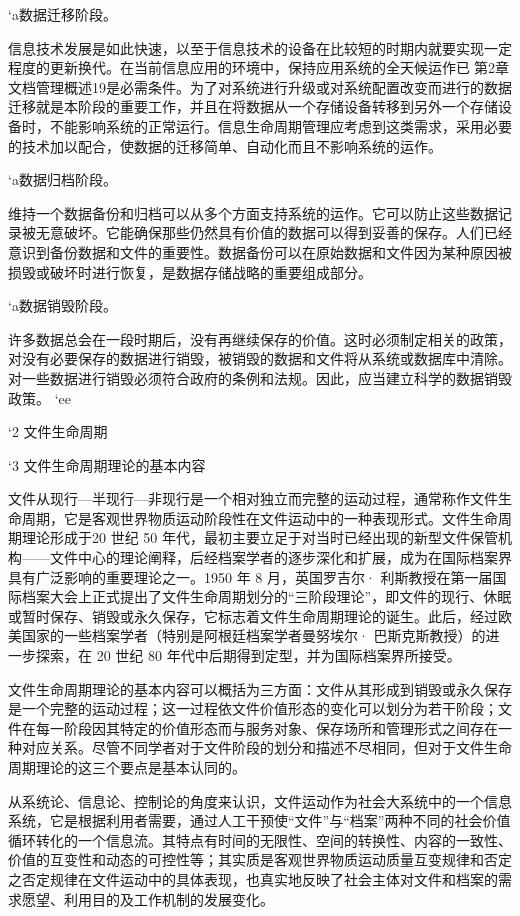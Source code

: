         `a数据迁移阶段。

        信息技术发展是如此快速，以至于信息技术的设备在比较短的时期内就要实现一定程度的更新换代。在当前信息应用的环境中，保持应用系统的全天候运作已第2章文档管理概述19是必需条件。为了对系统进行升级或对系统配置改变而进行的数据迁移就是本阶段的重要工作，并且在将数据从一个存储设备转移到另外一个存储设备时，不能影响系统的正常运行。信息生命周期管理应考虑到这类需求，采用必要的技术加以配合，使数据的迁移简单、自动化而且不影响系统的运作。

        `a数据归档阶段。

        维持一个数据备份和归档可以从多个方面支持系统的运作。它可以防止这些数据记录被无意破坏。它能确保那些仍然具有价值的数据可以得到妥善的保存。人们已经意识到备份数据和文件的重要性。数据备份可以在原始数据和文件因为某种原因被损毁或破坏时进行恢复，是数据存储战略的重要组成部分。

        `a数据销毁阶段。

        许多数据总会在一段时期后，没有再继续保存的价值。这时必须制定相关的政策，对没有必要保存的数据进行销毁，被销毁的数据和文件将从系统或数据库中清除。对一些数据进行销毁必须符合政府的条例和法规。因此，应当建立科学的数据销毁政策。
    `ee

`2 文件生命周期

    `3 文件生命周期理论的基本内容

    文件从现行—半现行—非现行是一个相对独立而完整的运动过程，通常称作文件生命周期，它是客观世界物质运动阶段性在文件运动中的一种表现形式。文件生命周期理论形成于20 世纪 50 年代，最初主要立足于对当时已经出现的新型文件保管机构——文件中心的理论阐释，后经档案学者的逐步深化和扩展，成为在国际档案界具有广泛影响的重要理论之一。1950 年 8 月，英国罗吉尔· 利斯教授在第一届国际档案大会上正式提出了文件生命周期划分的“三阶段理论”，即文件的现行、休眠或暂时保存、销毁或永久保存，它标志着文件生命周期理论的诞生。此后，经过欧美国家的一些档案学者（特别是阿根廷档案学者曼努埃尔· 巴斯克斯教授）的进一步探索，在 20 世纪 80 年代中后期得到定型，并为国际档案界所接受。

    文件生命周期理论的基本内容可以概括为三方面：文件从其形成到销毁或永久保存是一个完整的运动过程；这一过程依文件价值形态的变化可以划分为若干阶段；文件在每一阶段因其特定的价值形态而与服务对象、保存场所和管理形式之间存在一种对应关系。尽管不同学者对于文件阶段的划分和描述不尽相同，但对于文件生命周期理论的这三个要点是基本认同的。

    从系统论、信息论、控制论的角度来认识，文件运动作为社会大系统中的一个信息系统，它是根据利用者需要，通过人工干预使“文件”与“档案”两种不同的社会价值循环转化的一个信息流。其特点有时间的无限性、空间的转换性、内容的一致性、价值的互变性和动态的可控性等；其实质是客观世界物质运动质量互变规律和否定之否定规律在文件运动中的具体表现，也真实地反映了社会主体对文件和档案的需求愿望、利用目的及工作机制的发展变化。

